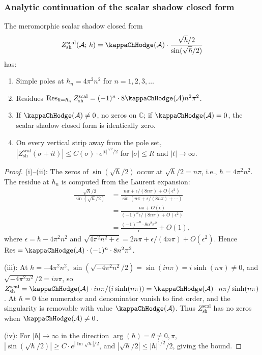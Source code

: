 \subsubsection{Analytic continuation of the scalar shadow closed form}

\begin{proposition}
The meromorphic scalar shadow closed form
\[
Z_{\mathrm{sh}}^{\mathrm{scal}}(\cA;\,\hbar)
= \kappaChHodge(\cA)\cdot
\frac{\sqrt{\hbar}/2}{\sin(\sqrt{\hbar}/2)}
\]
has:
\begin{enumerate}[label=\textup{(\roman*)}]
\item Simple poles at $\hbar_n = 4\pi^2 n^2$ for $n = 1, 2, 3, \ldots$
\item Residues $\Res_{\hbar = \hbar_n} Z_{\mathrm{sh}}^{\mathrm{scal}} = (-1)^{n} \cdot 8\kappaChHodge(\cA)n^2\pi^2$.
\item If $\kappaChHodge(\cA)\neq0$, no zeros on $\mathbb{C}$; if
$\kappaChHodge(\cA)=0$, the scalar shadow closed form is identically
zero.
\item On every vertical strip away from the pole set, $|Z_{\mathrm{sh}}^{\mathrm{scal}}(\sigma + i t)| \leq C(\sigma) \cdot e^{|t|^{1/2}/2}$ for $|\sigma| \leq R$ and $|t| \to \infty$.
\end{enumerate}
\end{proposition}

\begin{proof}
(i)--(ii): The zeros of $\sin(\sqrt{\hbar}/2)$ occur at $\sqrt{\hbar}/2 = n\pi$, i.e., $\hbar = 4\pi^2 n^2$. The residue at $\hbar_n$ is computed from the Laurent expansion:
\begin{align*}
\frac{\sqrt{\hbar}/2}{\sin(\sqrt{\hbar}/2)} &= \frac{n\pi + \epsilon/(8n\pi) + O(\epsilon^2)}{\sin(n\pi + \epsilon/(8n\pi) + \cdots)} \\
&= \frac{n\pi + O(\epsilon)}{(-1)^n \epsilon/(8n\pi) + O(\epsilon^2)} \\
&= \frac{(-1)^{-n} \cdot 8n^2\pi^2}{\epsilon} + O(1),
\end{align*}
where $\epsilon = \hbar - 4\pi^2 n^2$ and
$\sqrt{4\pi^2 n^2 + \epsilon} = 2n\pi + \epsilon/(4n\pi) + O(\epsilon^2)$.
Hence $\Res = \kappaChHodge(\cA) \cdot (-1)^{n} \cdot 8n^2\pi^2$.

(iii): At $\hbar = -4\pi^2 n^2$, $\sin(\sqrt{-4\pi^2 n^2}/2) = \sin(i n\pi) = i\sinh(n\pi) \neq 0$, and $\sqrt{-4\pi^2 n^2}/2 = i n\pi$, so $Z_{\mathrm{sh}}^{\mathrm{scal}} = \kappaChHodge(\cA) \cdot in\pi / (i\sinh(n\pi)) = \kappaChHodge(\cA) \cdot n\pi/\sinh(n\pi)$. At $\hbar=0$ the numerator and denominator vanish to first order, and the singularity is removable with value $\kappaChHodge(\cA)$. Thus $Z_{\mathrm{sh}}^{\mathrm{scal}}$ has no zeros when $\kappaChHodge(\cA)\neq0$.

(iv): For $|\hbar| \to \infty$ in the direction $\arg(\hbar) = \theta \neq 0, \pi$, $|\sin(\sqrt{\hbar}/2)| \geq C \cdot e^{|\operatorname{Im}\sqrt{\hbar}|/2}$, and $|\sqrt{\hbar}/2| \leq |\hbar|^{1/2}/2$, giving the bound.
\end{proof}

